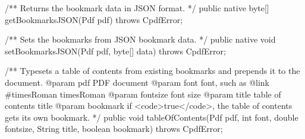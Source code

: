 /** Returns the bookmark data in JSON format. */
public native byte[] getBookmarksJSON(Pdf pdf) throws CpdfError;

/** Sets the bookmarks from JSON bookmark data. */
public native void setBookmarksJSON(Pdf pdf, byte[] data) throws CpdfError;

/** Typesets a table of contents from existing bookmarks and prepends it to
the document.
@param pdf PDF document
@param font font, such as {@link #timesRoman timesRoman}
@param fontsize font size
@param title table of contents title
@param bookmark if <code>true</code>, the table of contents gets its own
bookmark. */
public void tableOfContents(Pdf pdf, int font, double fontsize,
                            String title, boolean bookmark)
    throws CpdfError;
